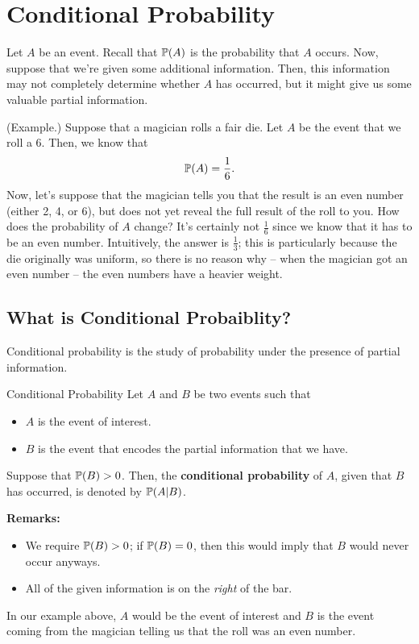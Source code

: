 \section{Conditional Probability}
Let $A$ be an event. Recall that $\mathbb{P}(A)$ is the probability that $A$ occurs. Now, suppose that we're given some additional information. Then, this information may not completely determine whether $A$ has occurred, but it might give us some valuable partial information. 

\begin{mdframed}[]
    (Example.) Suppose that a magician rolls a fair die. Let $A$ be the event that we roll a 6. Then, we know that 
    \[\mathbb{P}(A) = \frac{1}{6}.\]
    Now, let's suppose that the magician tells you that the result is an even number (either 2, 4, or 6), but does not yet reveal the full result of the roll to you. How does the probability of $A$ change? It's certainly not $\frac{1}{6}$ since we know that it has to be an even number. Intuitively, the answer is $\frac{1}{3}$; this is particularly because the die originally was uniform, so there is no reason why -- when the magician got an even number -- the even numbers have a heavier weight. 
\end{mdframed}

\subsection{What is Conditional Probaiblity?}
Conditional probability is the study of probability under the presence of partial information. 
\begin{definition}{Conditional Probability}{}
    Let $A$ and $B$ be two events such that 
    \begin{itemize}
        \item $A$ is  the event of interest.
        \item $B$ is the event that encodes the partial information that we have. 
    \end{itemize}
    Suppose that $\mathbb{P}(B) > 0$. Then, the \textbf{conditional probability} of $A$, given that $B$ has occurred, is denoted by $\mathbb{P}(A | B)$.  
\end{definition}
\textbf{Remarks:} 
\begin{itemize}
    \item We require $\mathbb{P}(B) > 0$; if $\mathbb{P}(B) = 0$, then this would imply that $B$ would never occur anyways. 
    \item All of the given information is on the \emph{right} of the bar. 
\end{itemize}
In our example above, $A$ would be the event of interest and $B$ is the event coming from the magician telling us that the roll was an even number. 

